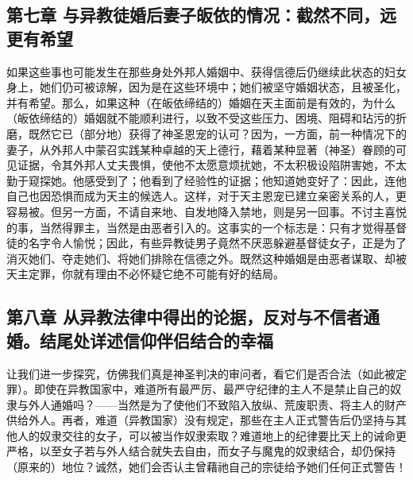 
\subsection{第七章 与异教徒婚后妻子皈依的情况：截然不同，远更有希望}

如果这些事也可能发生在那些身处外邦人婚姻中、获得信德后仍继续此状态的妇女身上，她们仍可被谅解，因为是在这些环境中；她们被坚守婚姻状态，且被圣化，并有希望。那么，如果这种（在皈依缔结的）婚姻在天主面前是有效的，为什么（皈依缔结的）婚姻就不能顺利进行，以致不受这些压力、困境、阻碍和玷污的折磨，既然它已（部分地）获得了神圣恩宠的认可？因为，一方面，前一种情况下的妻子，从外邦人中蒙召实践某种卓越的天上德行，藉着某种显著（神圣）眷顾的可见证据，令其外邦人丈夫畏惧，使他不太愿意烦扰她，不太积极设陷阱害她，不太勤于窥探她。他感受到了；他看到了经验性的证据；他知道她变好了：因此，连他自己也因恐惧而成为天主的候选人。这样，对于天主恩宠已建立亲密关系的人，更容易被。但另一方面，不请自来地、自发地降入禁地，则是另一回事。不讨主喜悦的事，当然得罪主，当然是由恶者引入的。这事实的一个标志是：只有才觉得基督徒的名字令人愉悦；因此，有些异教徒男子竟然不厌恶躲避基督徒女子，正是为了消灭她们、夺走她们、将她们排除在信德之外。既然这种婚姻是由恶者谋取、却被天主定罪，你就有理由不必怀疑它绝不可能有好的结局。\par


\subsection{第八章 从异教法律中得出的论据，反对与不信者通婚。结尾处详述信仰伴侣结合的幸福}

让我们进一步探究，仿佛我们真是神圣判决的审问者，看它们是否合法（如此被定罪）。即使在异教国家中，难道所有最严厉、最严守纪律的主人不是禁止自己的奴隶与外人通婚吗？——当然是为了使他们不致陷入放纵、荒废职责、将主人的财产供给外人。再者，难道（异教国家）没有规定，那些在主人正式警告后仍坚持与其他人的奴隶交往的女子，可以被当作奴隶索取？难道地上的纪律要比天上的诫命更严格，以至女子若与外人结合就失去自由，而女子与魔鬼的奴隶结合，却仍保持（原来的）地位？诚然，她们会否认主曾藉祂自己的宗徒给予她们任何正式警告！\par

